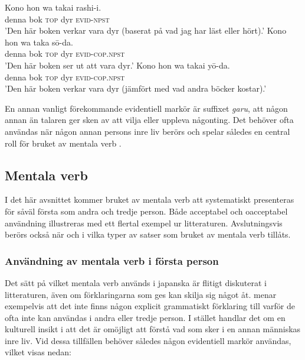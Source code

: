 \documentclass[12pt,a4paper]{article}
\begin{document}
\begin{exe}
\ex
\begin{xlist}
\ex
\label{ex:Makino1}
\gll Kono hon wa takai rashi-i. \\
     denna bok \textsc{top} dyr \textsc{evid}-\textsc{npst} \\
\glt 'Den här boken verkar vara dyr (baserat på vad jag har läst eller hört).'
\ex
\label{ex:Makino2}
\gll Kono hon wa taka s\=o-da. \\
     denna bok \textsc{top} dyr \textsc{evid}-\textsc{cop}.\textsc{npst} \\
\glt 'Den här boken ser ut att vara dyr.'
\ex
\label{ex:Makino3}
\gll Kono hon wa takai y\=o-da. \\
     denna bok \textsc{top} dyr \textsc{evid}-\textsc{cop}.\textsc{npst} \\
\glt 'Den här boken verkar vara dyr (jämfört med vad andra böcker kostar).'
\flushright \autocite[551]{makino1986}
\end{xlist}
\end{exe}

\noindent
En annan vanligt förekommande evidentiell markör är suffixet \emph{garu}, att någon annan än talaren ger sken av att vilja eller uppleva någonting. Det behöver ofta användas när någon annan persons inre liv berörs och spelar således en central roll för bruket av mentala verb \autocite{makino1986}.

\subsection{Mentala verb}
\label{sec:mentalaverb}
I det här avsnittet kommer bruket av mentala verb att systematiskt presenteras för såväl första som andra och tredje person. Både acceptabel och oacceptabel användning illustreras med ett flertal exempel ur litteraturen. Avslutningsvis berörs också när och i vilka typer av satser som bruket av mentala verb tillåts.

\subsubsection{Användning av mentala verb i första person}
\label{subsec:Bakgrund: Mentala verb: Användning av mentala verb i första person}
Det sätt på vilket mentala verb används i japanska är flitigt diskuterat i litteraturen, även om förklaringarna som ges kan skilja sig något åt. \textcite{hasegawa2015} menar exempelvis att det inte finns någon explicit grammatiskt förklaring till varför de ofta inte kan användas i andra eller tredje person. I stället handlar det om en kulturell insikt i att det är omöjligt att förstå vad som sker i en annan människas inre liv. Vid dessa tillfällen behöver således någon evidentiell markör användas, vilket visas nedan:
\end{document}
